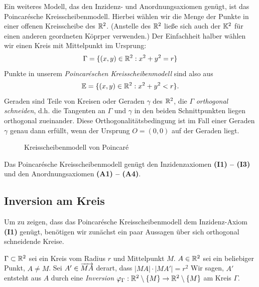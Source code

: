 Ein weiteres Modell, das den Inzidenz- und Anordnungsaxiomen genügt, ist das Poincarésche
Kreisscheibenmodell. Hierbei wählen wir die Menge der Punkte in einer offenen Kreisscheibe des
$\mathbb R^2$. (Anstelle des $\mathbb R^2$ ließe sich auch der $\mathbb K^2$ für einen anderen geordneten Köprper
verwenden.) Der Einfachheit halber wählen wir einen Kreis mit Mittelpunkt im Ursprung:
$$
    \Gamma = \{ (x,y) \in \mathbb R^2 :  x^2 + y^2 = r \}
$$
Punkte in unserem {\em  Poincaréschen Kreisscheibenmodell} sind also aus
$$
    \mathbb E = \{ (x,y) \in \mathbb R^2 :  x^2 + y^2 < r \}.
$$
Geraden sind Teile von Kreisen oder Geraden $\gamma$ des $\mathbb R^2$, die $\Gamma$ {\em orthogonal
schneiden}, d.h. die Tangenten an $\Gamma$ und $\gamma$ in den beiden Schnittpunkten liegen
orthogonal zueinander. Diese Orthogonalitätsbedingung ist im Fall einer Geraden $\gamma$ genau dann
erfüllt, wenn der Ursprung $O = (0,0)$ auf der Geraden liegt.

\begin{figure}[ht]
    
    \caption{Kreisscheibenmodell von Poincaré}
\end{figure}

\begin{thm} \label{thm:PoincareKreisscheibe}
    Das Poincarésche Kreisscheibenmodell genügt den Inzidenzaxiomen {\bf (I1) -- (I3)} und den
    Anordnungsaxiomen {\bf (A1) -- (A4)}.
\end{thm}

\subsection*{Inversion am Kreis}

Um zu zeigen, dass das Poincarésche Kreisscheibenmodell dem Inzidenz-Axiom {\bf (I1)} genügt,
benötigen wir zunächst ein paar Aussagen über sich orthogonal schneidende Kreise.


\begin{defi}
    $\Gamma \subset \mathbb R^2$ sei ein Kreis vom Radius $r$ und Mittelpunkt $M$. $A \in \mathbb R^2$ sei ein
    beliebiger Punkt, $A \neq M$. Sei $A' \in \mbox{${\overrightarrow{MA}}$}$ derart, dass $|MA| \cdot |MA'| = r^2$
    Wir sagen, $A'$ entsteht aus $A$ durch eine \emph{Inversion} $\varphi_\Gamma :
    \mathbb R^2 \setminus\{M\} \to \mathbb R^2 \setminus \{M\}$ am Kreis $\Gamma$.
\end{defi}

